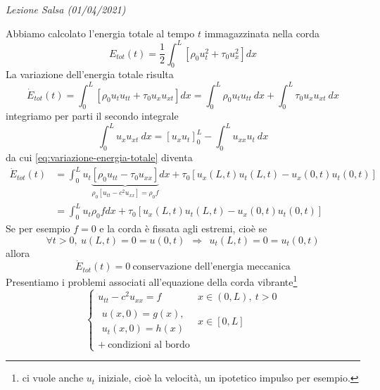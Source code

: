 \documentclass[10pt,a4paper,twoside,openright]{book}
\newcounter{conteggioS}
\newcommand{\LezioneS}[1]{
	\stepcounter{conteggioS}
	\textit{Lezione Salsa \arabic{conteggioS} (#1)}
	}
\begin{document}
\LezioneS{01/04/2021}

Abbiamo calcolato l'energia totale al tempo $t$ immagazzinata nella corda
\begin{equation*}
	E_{tot}( t) =\frac{1}{2}\int ^{L}_{0}\left[ \rho _{0} u^{2}_{t} +\tau _{0} u^{2}_{x}\right] dx
\end{equation*}
La variazione dell'energia totale risulta
\begin{equation}
	\dot{E}_{tot}( t) =\int ^{L}_{0}[ \rho _{0} u_{t} u_{tt} +\tau _{0} u_{x} u_{xt}] dx=\int ^{L}_{0} \rho _{0} u_{t} u_{tt} \ dx+\int ^{L}_{0} \tau _{0} u_{x} u_{xt} \ dx
	\label{eq:variazione-energia-totale}
\end{equation}
integriamo per parti il secondo integrale
\begin{equation*}
	\int ^{L}_{0} u_{x} u_{xt} \ dx=[ u_{x} u_{t}]^{L}_{0} -\int ^{L}_{0} u_{xx} u_{t} \ dx
\end{equation*}
da cui \eqref{eq:variazione-energia-totale} diventa
\begin{align*}
	\dot{E}_{tot}( t) & =\int ^{L}_{0} u_{t}\underbrace{[ \rho _{0} u_{tt} -\tau _{0} u_{xx}]}_{\rho _{0}\left[ u_{tt} -c^{2} u_{xx}\right] =\rho _{0} f} dx+\tau _{0}[ u_{x}( L,t) u_{t}( L,t) -u_{x}( 0,t) u_{t}( 0,t)] \\
	                  & =\int ^{L}_{0} u_{t} \rho _{0} fdx+\tau _{0}[ u_{x}( L,t) u_{t}( L,t) -u_{x}( 0,t) u_{t}( 0,t)]                                                                                                   
\end{align*}
Se per esempio $f=0$ e la corda è fissata agli estremi, cioè se
\begin{equation*}
	\forall t >0,\ u( L,t) =0=u( 0,t) \ \ \Rightarrow \ \ u_{t}( L,t) =0=u_{t}( 0,t)
\end{equation*}
allora
\begin{equation*}
	\dot{E}_{tot}( t) =0\ \text{conservazione dell'energia meccanica}
\end{equation*}
Presentiamo i problemi associati all'equazione della corda vibrante\footnote{ci vuole anche $u_{t}$ iniziale, cioè la velocità, un ipotetico impulso per esempio.}
\begin{equation*}
	\begin{cases}
		u_{tt} -c^{2} u_{xx} =f       & x\in ( 0,L) ,\ t >0 \\
		\begin{array}{l}
		u( x,0) =g( x) ,\\
		u_{t}( x,0) =h( x)
		\end{array}                   & x\in [ 0,L]         \\
		+\ \text{condizioni al bordo} &                     
	\end{cases}
\end{equation*}
\end{document}
